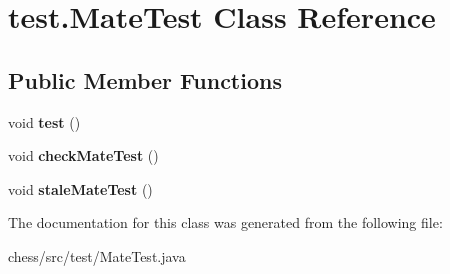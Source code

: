 \hypertarget{classtest_1_1_mate_test}{}\section{test.\+Mate\+Test Class Reference}
\label{classtest_1_1_mate_test}
\subsection*{Public Member Functions}
\begin{DoxyCompactItemize}
\item 
\mbox{\label{classtest_1_1_mate_test_a46bbc5920ff3838c4ee7344797840bca}} 
void {\bfseries test} ()
\item 
\mbox{\label{classtest_1_1_mate_test_a8e443226afd8f51733afbbc9ca9f3f75}} 
void {\bfseries check\+Mate\+Test} ()
\item 
\mbox{\label{classtest_1_1_mate_test_a2035ca2c48fdf12490ab91b697b5fd3d}} 
void {\bfseries stale\+Mate\+Test} ()
\end{DoxyCompactItemize}


The documentation for this class was generated from the following file\+:\begin{DoxyCompactItemize}
\item 
chess/src/test/Mate\+Test.\+java\end{DoxyCompactItemize}

